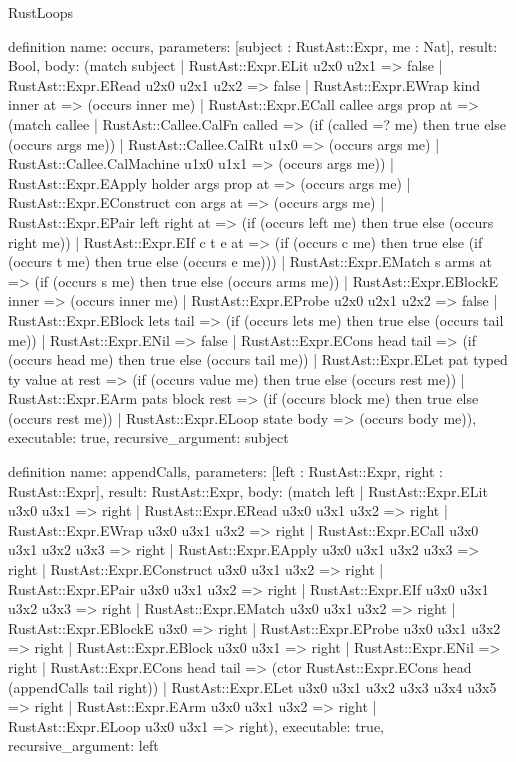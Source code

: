 \begin{lexlean}{RustLoops}
\begin{semanticmodule}
definition{
  name: occurs,
  parameters: [subject : RustAst::Expr, me : Nat],
  result: Bool,
  body: (match subject
    | RustAst::Expr.ELit u2x0 u2x1 => false
    | RustAst::Expr.ERead u2x0 u2x1 u2x2 => false
    | RustAst::Expr.EWrap kind inner at => (occurs inner me)
    | RustAst::Expr.ECall callee args prop at => (match callee
      | RustAst::Callee.CalFn called => (if (called =? me) then true else (occurs args me))
      | RustAst::Callee.CalRt u1x0 => (occurs args me)
      | RustAst::Callee.CalMachine u1x0 u1x1 => (occurs args me))
    | RustAst::Expr.EApply holder args prop at => (occurs args me)
    | RustAst::Expr.EConstruct con args at => (occurs args me)
    | RustAst::Expr.EPair left right at => (if (occurs left me) then true else (occurs right me))
    | RustAst::Expr.EIf c t e at => (if (occurs c me) then true else (if (occurs t me) then true else (occurs e me)))
    | RustAst::Expr.EMatch s arms at => (if (occurs s me) then true else (occurs arms me))
    | RustAst::Expr.EBlockE inner => (occurs inner me)
    | RustAst::Expr.EProbe u2x0 u2x1 u2x2 => false
    | RustAst::Expr.EBlock lets tail => (if (occurs lets me) then true else (occurs tail me))
    | RustAst::Expr.ENil => false
    | RustAst::Expr.ECons head tail => (if (occurs head me) then true else (occurs tail me))
    | RustAst::Expr.ELet pat typed ty value at rest => (if (occurs value me) then true else (occurs rest me))
    | RustAst::Expr.EArm pats block rest => (if (occurs block me) then true else (occurs rest me))
    | RustAst::Expr.ELoop state body => (occurs body me)),
  executable: true,
  recursive_argument: subject
}

definition{
  name: appendCalls,
  parameters: [left : RustAst::Expr, right : RustAst::Expr],
  result: RustAst::Expr,
  body: (match left
    | RustAst::Expr.ELit u3x0 u3x1 => right
    | RustAst::Expr.ERead u3x0 u3x1 u3x2 => right
    | RustAst::Expr.EWrap u3x0 u3x1 u3x2 => right
    | RustAst::Expr.ECall u3x0 u3x1 u3x2 u3x3 => right
    | RustAst::Expr.EApply u3x0 u3x1 u3x2 u3x3 => right
    | RustAst::Expr.EConstruct u3x0 u3x1 u3x2 => right
    | RustAst::Expr.EPair u3x0 u3x1 u3x2 => right
    | RustAst::Expr.EIf u3x0 u3x1 u3x2 u3x3 => right
    | RustAst::Expr.EMatch u3x0 u3x1 u3x2 => right
    | RustAst::Expr.EBlockE u3x0 => right
    | RustAst::Expr.EProbe u3x0 u3x1 u3x2 => right
    | RustAst::Expr.EBlock u3x0 u3x1 => right
    | RustAst::Expr.ENil => right
    | RustAst::Expr.ECons head tail => (ctor RustAst::Expr.ECons head (appendCalls tail right))
    | RustAst::Expr.ELet u3x0 u3x1 u3x2 u3x3 u3x4 u3x5 => right
    | RustAst::Expr.EArm u3x0 u3x1 u3x2 => right
    | RustAst::Expr.ELoop u3x0 u3x1 => right),
  executable: true,
  recursive_argument: left
}


\end{semanticmodule}
\end{lexlean}
